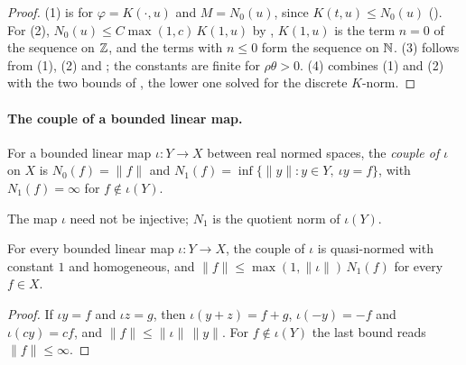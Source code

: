 \begin{proof}
\leanok
(1) is  for $\varphi = K(\cdot, u)$ and $M = N_0(u)$, since
$K(t, u) \leq N_0(u)$ (). For (2), $N_0(u) \leq C \max(1, c) \,
K(1, u)$ by , $K(1, u)$ is the term $n = 0$ of the sequence on $\mathbb{Z}$, and
the terms with $n \leq 0$ form the sequence on $\mathbb{N}$. (3) follows from (1), (2) and
; the constants are finite for $\rho\theta > 0$. (4)
combines (1) and (2) with the two bounds of , the lower
one solved for the discrete $K$-norm.
\end{proof}

\paragraph{The couple of a bounded linear map.}

\begin{definition}
\label{def:map-couple}
\leanok
{}
For a bounded linear map $\iota : Y \to X$ between real normed spaces, the \emph{couple of
$\iota$} on $X$ is $N_0(f) = \|f\|$ and $N_1(f) = \inf \{\|y\| : y \in Y, \ \iota y = f\}$,
with $N_1(f) = \infty$ for $f \notin \iota(Y)$.
\end{definition}

The map $\iota$ need not be injective; $N_1$ is the quotient norm of $\iota(Y)$.

\begin{lemma}
\label{lem:map-couple}
\leanok
{}
For every bounded linear map $\iota : Y \to X$, the couple of $\iota$ is quasi-normed with
constant $1$ and homogeneous, and $\|f\| \leq \max(1, \|\iota\|) \, N_1(f)$ for every $f \in X$.
\end{lemma}

\begin{proof}
\leanok
If $\iota y = f$ and $\iota z = g$, then $\iota(y + z) = f + g$, $\iota(-y) = -f$ and
$\iota(c y) = c f$, and $\|f\| \leq \|\iota\| \, \|y\|$. For $f \notin \iota(Y)$ the last
bound reads $\|f\| \leq \infty$.
\end{proof}

